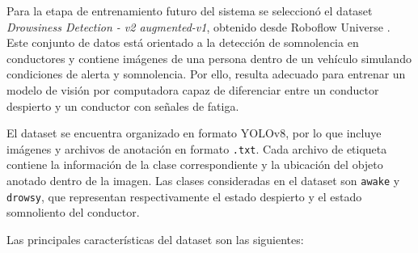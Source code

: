 \documentclass[conference]{IEEEtran}
\begin{document}
Para la etapa de entrenamiento futuro del sistema se seleccionó el dataset \textit{Drowsiness Detection - v2 augmented-v1}, obtenido desde Roboflow Universe \parencite{roboflowDrowsiness2023}. Este conjunto de datos está orientado a la detección de somnolencia en conductores y contiene imágenes de una persona dentro de un vehículo simulando condiciones de alerta y somnolencia. Por ello, resulta adecuado para entrenar un modelo de visión por computadora capaz de diferenciar entre un conductor despierto y un conductor con señales de fatiga.

El dataset se encuentra organizado en formato YOLOv8, por lo que incluye imágenes y archivos de anotación en formato \texttt{.txt}. Cada archivo de etiqueta contiene la información de la clase correspondiente y la ubicación del objeto anotado dentro de la imagen. Las clases consideradas en el dataset son \texttt{awake} y \texttt{drowsy}, que representan respectivamente el estado despierto y el estado somnoliento del conductor.

Las principales características del dataset son las siguientes:

\begin{table}[H]
\centering
\caption{Características generales del dataset}
\label{tab:caracteristicas_dataset}
\end{table}
\end{document}
